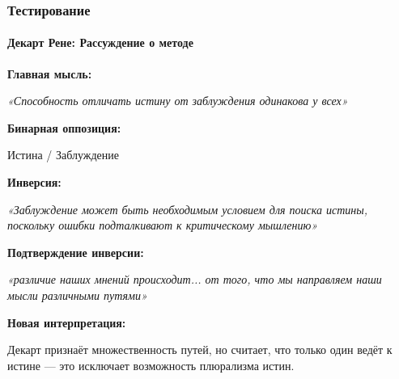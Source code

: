 \documentclass{beamer}
\begin{document}
\begin{frame}
\frametitle{Тестирование}
\framesubtitle{Декарт Рене: Рассуждение о методе}

\textbf{Главная мысль:}

\textit{«Способность отличать истину от заблуждения одинакова у всех»}

\vspace{0.3cm}

\textbf{Бинарная оппозиция:}

Истина / Заблуждение

\vspace{0.3cm}

\textbf{Инверсия:}

\textit{«Заблуждение может быть необходимым условием для поиска истины, поскольку ошибки подталкивают к критическому мышлению»}

\vspace{0.3cm}

\textbf{Подтверждение инверсии:}

\textit{«различие наших мнений происходит... от того, что мы направляем наши мысли различными путями»}

\vspace{0.3cm}

\textbf{Новая интерпретация:}

Декарт признаёт множественность путей, но считает, что только один ведёт к истине — это исключает возможность плюрализма истин.
\end{frame}
\end{document}
